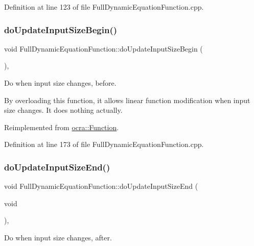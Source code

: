 Definition at line 123 of file Full\+Dynamic\+Equation\+Function.\+cpp.

\hypertarget{group__constraint_gadbdce52af8ba057e93ea923db5a3ce04}{}\label{group__constraint_gadbdce52af8ba057e93ea923db5a3ce04} 
\subsubsection{\texorpdfstring{do\+Update\+Input\+Size\+Begin()}{doUpdateInputSizeBegin()}}
{\footnotesize\ttfamily void Full\+Dynamic\+Equation\+Function\+::do\+Update\+Input\+Size\+Begin (\begin{DoxyParamCaption}{ }\end{DoxyParamCaption})\hspace{0.3cm}{\ttfamily [protected]}, {\ttfamily [virtual]}}

Do when input size changes, before.

By overloading this function, it allows linear function modification when input size changes. It does nothing actually. 

Reimplemented from \hyperlink{classocra_1_1Function_a3f728f3758e6448aa59932853db5ddcc}{ocra\+::\+Function}.



Definition at line 173 of file Full\+Dynamic\+Equation\+Function.\+cpp.

\hypertarget{group__constraint_ga8c14a0ff3f87c32d030a3a1753b7a77e}{}\label{group__constraint_ga8c14a0ff3f87c32d030a3a1753b7a77e} 
\subsubsection{\texorpdfstring{do\+Update\+Input\+Size\+End()}{doUpdateInputSizeEnd()}}
{\footnotesize\ttfamily void Full\+Dynamic\+Equation\+Function\+::do\+Update\+Input\+Size\+End (\begin{DoxyParamCaption}\item[{void}]{ }\end{DoxyParamCaption})\hspace{0.3cm}{\ttfamily [protected]}, {\ttfamily [virtual]}}

Do when input size changes, after.

